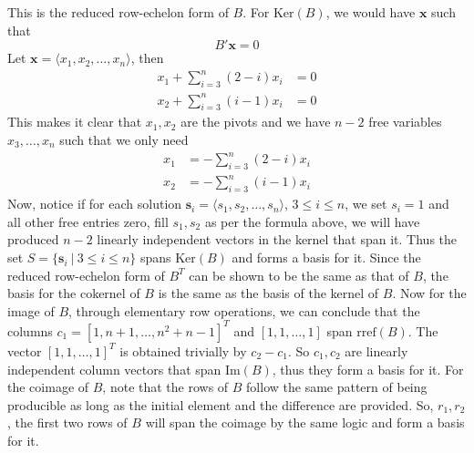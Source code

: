 \documentclass{article}
\begin{document}
This is the reduced row-echelon form of $B$. For $\text{Ker}(B)$, we would have $\mathbf{x}$ such that
\begin{equation*}
    B' \mathbf{x} = 0
\end{equation*}
Let $\mathbf{x} = \langle x_{1}, x_{2}, \dots, x_{n}\rangle$, then
\begin{align*}
    x_{1} + \sum_{i=3}^{n}(2-i)x_{i} &= 0\\
    x_{2} + \sum_{i=3}^{n}(i-1)x_{i} &= 0
\end{align*}
This makes it clear that $x_{1}, x_{2}$ are the pivots and we have $n-2$ free variables $x_{3}, \dots, x_{n}$ such that we only need
\begin{align*}
    x_{1} &= - \sum_{i=3}^{n}(2-i)x_{i}\\
    x_{2} &= - \sum_{i=3}^{n}(i-1)x_{i}
\end{align*}
Now, notice if for each solution $\mathbf{s}_{i} = \langle s_{1}, s_{2}, \dots, s_{n}\rangle$, $3 \leq i \leq n$, we set $s_{i} = 1$ and all other free entries zero, fill $s_{1},s_{2}$ as per the formula above, we will have produced $n-2$ linearly independent vectors in the kernel that span it. Thus the set $S = \{\mathbf{s}_{i} \ | \ 3\leq i \leq n\}$ spans $\text{Ker}(B)$ and forms a basis for it. Since the reduced row-echelon form of $B^{T}$ can be shown to be the same as that of $B$, the basis for the cokernel of $B$ is the same as the basis of the kernel of $B$. Now for the image of $B$, through elementary row operations, we can conclude that the columns $c_{1} = [1, n+1, \dots, n^{2} + n - 1]^{T}$ and $[1, 1,\dots, 1]$ span $\text{rref}(B)$. The vector $[1,1,\dots,1]^{T}$ is obtained trivially by $c_{2} - c_{1}$. So $c_{1}, c_{2}$ are linearly independent column vectors that span $\text{Im}(B)$, thus they form a basis for it. For the coimage of $B$, note that the rows of $B$ follow the same pattern of being producible as long as the initial element and the difference are provided. So, $r_{1}, r_{2}$, the first two rows of $B$ will span the coimage by the same logic and form a basis for it. 

\end{document}
